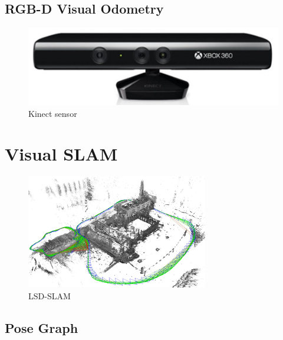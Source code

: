 \subsection{RGB-D Visual Odometry}%
\label{sub:rgbd-visual-odometry}

\begin{figure}[ht]
	\centering
	\includegraphics[width=\linewidth]{assets/img/kinect.jpg}
	\caption{Kinect sensor}%
	\label{fig:kinect}
\end{figure}

\section{Visual SLAM}%
\label{sec:v-slam}

\begin{figure}[ht]
	\centering
	\includegraphics[width=\linewidth]{assets/img/lsd-slam.png}
	\caption{LSD-SLAM}%
	\label{fig:lsd-slam}
\end{figure}

\subsection{Pose Graph}%
\label{sub:pose-graph}

